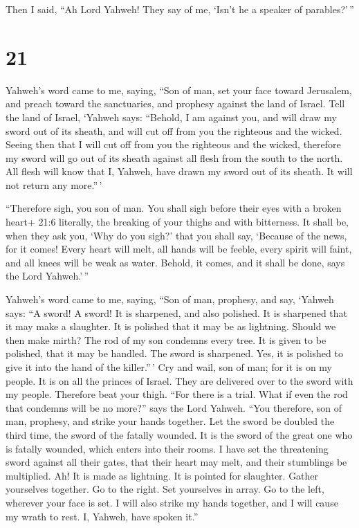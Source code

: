  Then I said, ``Ah Lord Yahweh! They say of me, `Isn't he a
speaker of parables?'\,''

\hypertarget{section-19}{%
\section{21}\label{section-19}}

 Yahweh's word came to me, saying,  ``Son of
man, set your face toward Jerusalem, and preach toward the sanctuaries,
and prophesy against the land of Israel.  Tell the land of
Israel, `Yahweh says: ``Behold, I am against you, and will draw my sword
out of its sheath, and will cut off from you the righteous and the
wicked.  Seeing then that I will cut off from you the
righteous and the wicked, therefore my sword will go out of its sheath
against all flesh from the south to the north.  All flesh
will know that I, Yahweh, have drawn my sword out of its sheath. It will
not return any more.''\,'

 ``Therefore sigh, you son of man. You shall sigh before
their eyes with a broken heart+ 21:6 literally, the breaking of your
thighs and with bitterness.  It shall be, when they ask you,
`Why do you sigh?' that you shall say, `Because of the news, for it
comes! Every heart will melt, all hands will be feeble, every spirit
will faint, and all knees will be weak as water. Behold, it comes, and
it shall be done, says the Lord Yahweh.'\,''

 Yahweh's word came to me, saying,  ``Son of
man, prophesy, and say, `Yahweh says: ``A sword! A sword! It is
sharpened, and also polished.  It is sharpened that it may
make a slaughter. It is polished that it may be as lightning. Should we
then make mirth? The rod of my son condemns every tree.  It
is given to be polished, that it may be handled. The sword is sharpened.
Yes, it is polished to give it into the hand of the killer.''\,'
 Cry and wail, son of man; for it is on my people. It is on
all the princes of Israel. They are delivered over to the sword with my
people. Therefore beat your thigh.  ``For there is a trial.
What if even the rod that condemns will be no more?'' says the Lord
Yahweh.  ``You therefore, son of man, prophesy, and strike
your hands together. Let the sword be doubled the third time, the sword
of the fatally wounded. It is the sword of the great one who is fatally
wounded, which enters into their rooms.  I have set the
threatening sword against all their gates, that their heart may melt,
and their stumblings be multiplied. Ah! It is made as lightning. It is
pointed for slaughter.  Gather yourselves together. Go to
the right. Set yourselves in array. Go to the left, wherever your face
is set.  I will also strike my hands together, and I will
cause my wrath to rest. I, Yahweh, have spoken it.''

